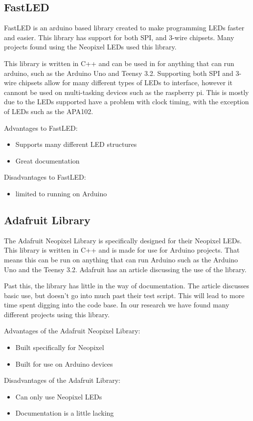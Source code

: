 \documentclass[onecolumn, draftclsnofoot,10pt, compsoc]{IEEEtran}
\begin{document}
		\subsection{FastLED}
		\noindent FastLED is an arduino based library created to make programming LEDs
		faster and easier. This library has support for both SPI, and 3-wire
		chipsets\cite[Pg 2]{fastLED}. Many projects found using the Neopixel LEDs
		used this library.

		\vspace{5mm}
		\noindent This library is written in C++ and can be used in for anything that can run
		arduino, such as the Arduino Uno and Teensy 3.2. Supporting both SPI and
		3-wire chipsets allow for many different types of LEDs to interface,
		however it cannont be used on multi-tasking devices such as the raspberry
		pi. This is mostly due to the LEDs supported have a problem with clock
		timing, with the exception of LEDs such as the APA102.

		\vspace{5mm}
		\noindent Advantages to FastLED:
		\begin{itemize}
			\item Supports many different LED structures
			\item Great documentation
		\end{itemize}
		Disadvantages to FastLED:
		\begin{itemize}
			\item limited to running on Arduino
		\end{itemize}
		\subsection{Adafruit Library}
		\noindent The Adafruit Neopixel Library is specifically designed for their Neopixel
		LEDs. This library is written in C++ and is made for use for Arduino
		projects. That means this can be run on anything that can run Arduino such
		as the Arduino Uno and the Teensy 3.2. Adafruit has an article discussing
		the use of the library\cite[Pg 2]{neolib}.


		\vspace{5mm}
		\noindent Past this, the library has little in the way of documentation. The article
		discusses basic use, but doesn't go into much past their test script. This
		will lead to more time spent digging into the code base. In our research we
		have found many different projects using this library.

		\vspace{5mm}
		\noindent Advantages of the Adafruit Neopixel Library:
		\begin{itemize}
			\item Built specifically for Neopixel
			\item Built for use on Arduino devices
		\end{itemize}
		Disadvantages of the Adafruit Library:
		\begin{itemize}
			\item Can only use Neopixel LEDs
			\item Documentation is a little lacking
		\end{itemize}
\end{document}
